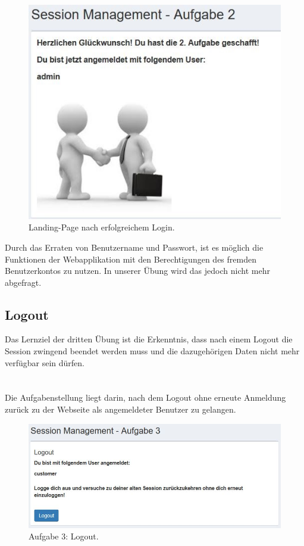 \begin{figure}[H]
	\includegraphics[width=1.0\linewidth]{images/BrokenAuthenticationAndSessionManagement/Login_Ende}
	\caption[Landing-Page nach erfolgreichem Login.]{Landing-Page nach erfolgreichem Login.}
	\label{fig:Aufgabe 2 Abschluss}
\end{figure} 
\noindent Durch das Erraten von Benutzername und Passwort, ist es möglich die Funktionen der Webapplikation mit den Berechtigungen des fremden Benutzerkontos zu nutzen. In unserer Übung wird das jedoch nicht mehr abgefragt.
\subsection{Logout}
Das Lernziel der dritten Übung ist die Erkenntnis, dass nach einem Logout die Session zwingend beendet werden muss und die dazugehörigen Daten nicht mehr verfügbar sein dürfen.\\\\\\
Die Aufgabenstellung liegt darin, nach dem Logout ohne erneute Anmeldung zurück zu der Webseite als angemeldeter Benutzer zu gelangen.\\ 
\begin{figure}[H]
	\includegraphics[width=1.0\linewidth]{images/BrokenAuthenticationAndSessionManagement/Logout_Start}
	\caption[Aufgabe 3: Logout.]{Aufgabe 3: Logout.}
	\label{fig:Aufgabe 3 Logout}
\end{figure}



